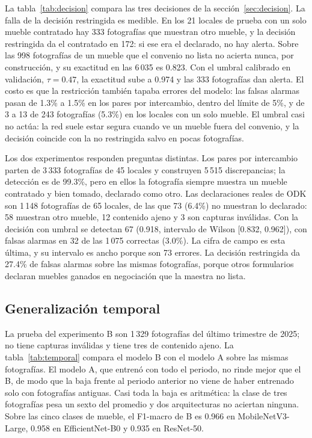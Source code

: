 \documentclass[conference]{IEEEtran}
\begin{document}
La tabla~\ref{tab:decision} compara las tres decisiones de la sección~\ref{sec:decision}. La falla de la decisión
restringida es medible. En los 21
locales de prueba con un solo mueble contratado hay 333 fotografías que muestran otro mueble, y la decisión
restringida da el contratado en 172: si ese era el declarado, no hay alerta. Sobre las 998 fotografías de un
mueble que el convenio no lista no acierta nunca, por construcción, y su exactitud en las 6\,035 es 0.823. Con el
umbral calibrado en validación, $\tau = 0.47$, la exactitud sube a 0.974 y las 333 fotografías dan alerta. El
costo es que la restricción también tapaba errores del modelo: las falsas alarmas pasan de 1.3\% a 1.5\% en
los pares por intercambio, dentro del límite de 5\%, y de 3 a 13 de 243 fotografías (5.3\%) en los locales con
un solo mueble. El umbral casi no actúa: la red suele estar segura cuando ve un mueble fuera del convenio, y la
decisión coincide con la no restringida salvo en pocas fotografías.

Los dos experimentos responden preguntas distintas. Los pares por intercambio parten de 3\,333 fotografías de 45
locales y construyen 5\,515 discrepancias; la detección es de 99.3\%, pero en ellos la fotografía siempre
muestra un mueble contratado y bien tomado, declarado como otro. Las declaraciones reales de ODK son 1\,148
fotografías de 65 locales, de las que 73 (6.4\%) no muestran lo declarado: 58 muestran otro mueble, 12 contenido
ajeno y 3 son capturas inválidas. Con la decisión con umbral se detectan 67 (0.918, intervalo de Wilson
[0.832, 0.962]), con falsas alarmas en 32 de las 1\,075 correctas (3.0\%). La cifra de campo es esta última, y
su intervalo es ancho porque son 73 errores. La decisión restringida da 27.4\% de falsas alarmas sobre las
mismas fotografías, porque otros formularios declaran muebles ganados en negociación que la maestra no lista.

\subsection{Generalización temporal}

La prueba del experimento B son 1\,329 fotografías del último trimestre de 2025; no tiene capturas inválidas y
tiene tres de contenido ajeno. La tabla~\ref{tab:temporal} compara el modelo B con el modelo A sobre las mismas
fotografías. El modelo A, que entrenó con todo el periodo, no rinde mejor que el B, de modo que la baja frente al
periodo anterior no viene de haber entrenado solo con fotografías antiguas. Casi toda la baja es aritmética: la
clase de tres fotografías pesa un sexto del promedio y dos arquitecturas no aciertan ninguna. Sobre las cinco
clases de mueble, el F1-macro de B es 0.966 en MobileNetV3-Large, 0.958 en EfficientNet-B0 y 0.935 en ResNet-50.
\end{document}
